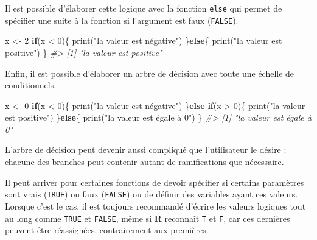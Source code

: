 \documentclass[
]{book}
\newenvironment{Shaded}{}{}
\newcommand{\CommentTok}[1]{\textit{#1}}
\newcommand{\ControlFlowTok}[1]{\textbf{#1}}
\newcommand{\DecValTok}[1]{#1}
\newcommand{\FunctionTok}[1]{#1}
\newcommand{\NormalTok}[1]{#1}
\newcommand{\OtherTok}[1]{#1}
\newcommand{\SpecialCharTok}[1]{#1}
\newcommand{\StringTok}[1]{#1}
\begin{document}
Il est possible d'élaborer cette logique avec la fonction \texttt{else} qui permet de spécifier une suite à la fonction si l'argument est faux (\texttt{FALSE}).

\begin{Shaded}
\begin{Highlighting}[]
\NormalTok{x }\OtherTok{\textless{}{-}} \DecValTok{2}
\ControlFlowTok{if}\NormalTok{(x }\SpecialCharTok{\textless{}} \DecValTok{0}\NormalTok{)\{}
  \FunctionTok{print}\NormalTok{(}\StringTok{"la valeur est négative"}\NormalTok{)}
\NormalTok{\}}\ControlFlowTok{else}\NormalTok{\{}
  \FunctionTok{print}\NormalTok{(}\StringTok{"la valeur est positive"}\NormalTok{)}
\NormalTok{\}}
\CommentTok{\#\textgreater{} [1] "la valeur est positive"}
\end{Highlighting}
\end{Shaded}

Enfin, il est possible d'élaborer un arbre de décision avec toute une échelle de conditionnels.

\begin{Shaded}
\begin{Highlighting}[]
\NormalTok{x }\OtherTok{\textless{}{-}} \DecValTok{0}
\ControlFlowTok{if}\NormalTok{(x }\SpecialCharTok{\textless{}} \DecValTok{0}\NormalTok{)\{}
  \FunctionTok{print}\NormalTok{(}\StringTok{"la valeur est négative"}\NormalTok{)}
\NormalTok{\}}\ControlFlowTok{else} \ControlFlowTok{if}\NormalTok{(x }\SpecialCharTok{\textgreater{}} \DecValTok{0}\NormalTok{)\{}
  \FunctionTok{print}\NormalTok{(}\StringTok{"la valeur est positive"}\NormalTok{)}
\NormalTok{\}}\ControlFlowTok{else}\NormalTok{\{}
  \FunctionTok{print}\NormalTok{(}\StringTok{"la valeur est égale à 0"}\NormalTok{)}
\NormalTok{\}}
\CommentTok{\#\textgreater{} [1] "la valeur est égale à 0"}
\end{Highlighting}
\end{Shaded}

L'arbre de décision peut devenir aussi compliqué que l'utilisateur le désire : chacune des branches peut contenir autant de ramifications que nécessaire.

Il peut arriver pour certaines fonctions de devoir spécifier si certains paramètres sont vrais (\texttt{TRUE}) ou faux (\texttt{FALSE}) ou de définir des variables ayant ces valeurs. Lorsque c'est le cas, il est toujours recommandé d'écrire les valeurs logiques tout au long comme \texttt{TRUE} et \texttt{FALSE}, même si \textbf{R} reconnaît \texttt{T} et \texttt{F}, car ces dernières peuvent être réassignées, contrairement aux premières.
\end{document}

